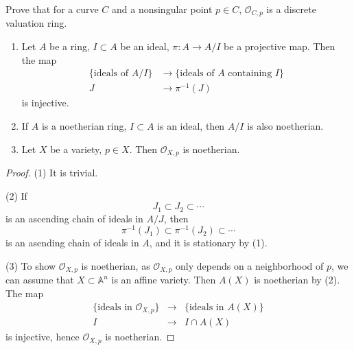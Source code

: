 \begin{exercise}
	Prove that for a curve $ C $ and a nonsingular point $ p\in C $, $ \mathcal{O}_{C,p} $ is a discrete valuation ring.
\end{exercise}
\begin{proposition}
  {}
  \noindent
\begin{enumerate}
		\item Let $ A $ be a ring, $ I\subset A $ be an ideal, $ \pi:A\to A/I $ be a projective map. Then the map
			      \begin{align*}
				      \lbrace\text{ideals of }A/I \rbrace & \to  \lbrace \text{ideals of }A \text{ containing } I\rbrace \\
				      J                                   & \to  \pi^{-1}(J)
			      \end{align*}
		      is injective.
		\item If $ A $ is a noetherian ring, $ I\subset A$ is an ideal, then $ A/I $ is also noetherian.
		\item Let $ X $ be a variety, $ p\in X $. Then $ \mathcal{O}_{X,p} $ is noetherian.
	\end{enumerate}
\end{proposition}
\begin{proof}
  (1) It is trivial.

  (2) If 
  \[
  J_1\subset J_2\subset \cdots 
  \] 
  is an ascending chain of ideals in $A / J$, then 
  \[
    \pi^{-1}(J_1)\subset  \pi^{-1}(J_2)\subset \cdots 
  \] 
  is an asending  chain of ideals in $A$, and it is stationary by (1).

  (3) To show $ \mathcal{O}_{X,p} $ is noetherian, as $ \mathcal{O}_{X,p} $ only depends on a neighborhood of $ p $, we can assume that $ X\subset \mathbb{A}^n $ is an affine variety. Then $ A(X) $ is noetherian by (2). The map
		\begin{align*}
			\lbrace \text{ideals in }\mathcal{O}_{X,p} \rbrace & \to & \lbrace \text{ideals in }A(X) \rbrace \\
			I                                                  & \to & I\cap A(X)
		\end{align*}
	is injective, hence $ \mathcal{O}_{X,p} $ is noetherian.
\end{proof}

